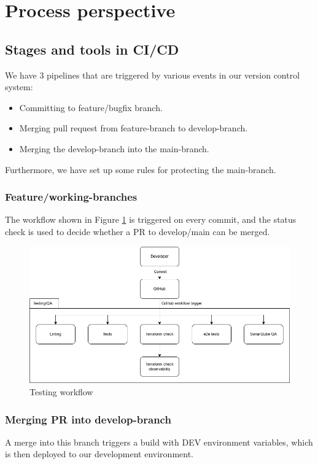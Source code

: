 \section{Process perspective} \label{pp}

\subsection{Stages and tools in CI/CD} 
We have 3 pipelines that are triggered by various events in our  version control system:
\begin{itemize}
    \item Committing to feature/bugfix branch.
    \item Merging pull request from feature-branch to develop-branch.
    \item Merging the develop-branch into the main-branch.
\end{itemize}
Furthermore, we have set up some rules for protecting the main-branch.

\subsubsection*{Feature/working-branches}
The workflow shown in Figure \ref{fig:test-workflow} is triggered on every commit, and the status check is used to decide whether a PR to develop/main can be merged.
\begin{figure}[h!]
  \centering 
  \includegraphics[width=\textwidth]{images/Testing workflow.png}
  \caption{Testing workflow}
  \label{fig:test-workflow}
\end{figure}

\subsubsection*{Merging PR into develop-branch}
A merge into this branch triggers a build with DEV environment variables, which is then deployed to our development environment.

